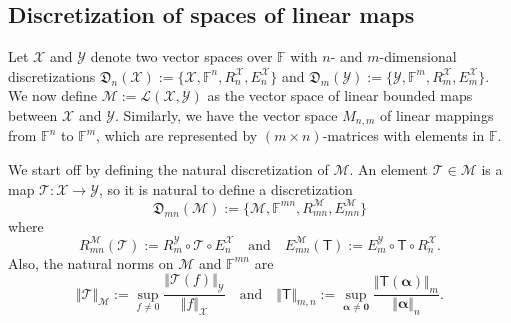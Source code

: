 \documentclass[a4paper]{paper}
\newcommand{\discr}{\mathfrak{D}}
\newcommand{\VecSpace}[1]{\mathscr{#1}}
\newcommand{\Field}{\mathbb{F}}
\newcommand{\Op}[1]{\mathcal{#1}}
\newcommand{\DiscOp}[1]{\mathsf{#1}}
\newcommand{\vzero}{\boldsymbol{0}}
\newcommand{\valpha}{\boldsymbol{\alpha}}
\begin{document}
\subsection{Discretization of spaces of linear maps}
Let $\VecSpace{X}$ and $\VecSpace{Y}$ denote two vector spaces over $\Field$ with 
$n$- and $m$-dimensional discretizations 
$\discr_{n}(\VecSpace{X}) := \{ \VecSpace{X}, \Field^{n}, R_{n}^{\VecSpace{X}},E_{n}^{\VecSpace{X}} \}$
and
    $\discr_{m}(\VecSpace{Y}) := \{ \VecSpace{Y}, \Field^{m}, R_{m}^{\VecSpace{X}},E_{m}^{\VecSpace{X}} \}$.
We now define $\VecSpace{M}:=\VecSpace{L}(\VecSpace{X},\VecSpace{Y})$ as the vector space of linear bounded maps
between $\VecSpace{X}$ and $\VecSpace{Y}$. Similarly, we have the vector space $M_{n,m}$
of linear mappings from $\Field^{n}$ to $\Field^{m}$, which are represented by $(m \times n)$-matrices with elements in 
$\Field$.

We start off by defining the natural discretization of $\VecSpace{M}$. An element $\Op{T} \in \VecSpace{M}$
is a map $\Op{T} \colon \VecSpace{X} \to \VecSpace{Y}$, so it is natural to define a discretization 
\[ 
 \discr_{m n}(\VecSpace{M}) := \{ \VecSpace{M}, \Field^{m n}, R_{m n}^{\VecSpace{M}},E_{m n}^{\VecSpace{M}} \} 
\]
where
\[ 
R_{m n}^{\VecSpace{M}}(\Op{T}) := R_{m}^{\VecSpace{Y}} \circ \Op{T} \circ E_{n}^{\VecSpace{X}} 
\quad\text{and}\quad
E_{m n}^{\VecSpace{M}}(\DiscOp{T}) := E_{m}^{\VecSpace{Y}} \circ \DiscOp{T} \circ R_{n}^{\VecSpace{X}}.
\]
Also, the natural norms on $\VecSpace{M}$ and $\Field^{mn}$ are 
\[  \Vert \Op{T} \Vert_{\VecSpace{M}} := \sup_{f \neq 0} \frac{\bigl\Vert \Op{T}(f) \bigr\Vert_{\VecSpace{Y}}}{\Vert f \Vert_{\VecSpace{X}}} 
   \quad\text{and}\quad
   \Vert \DiscOp{T} \Vert_{m,n} := \sup_{\valpha \neq \vzero} 
     \frac{\bigl\Vert \DiscOp{T}(\valpha) \bigr\Vert_{m}}{\Vert \valpha \Vert_{n}}. 
\]
\end{document}
